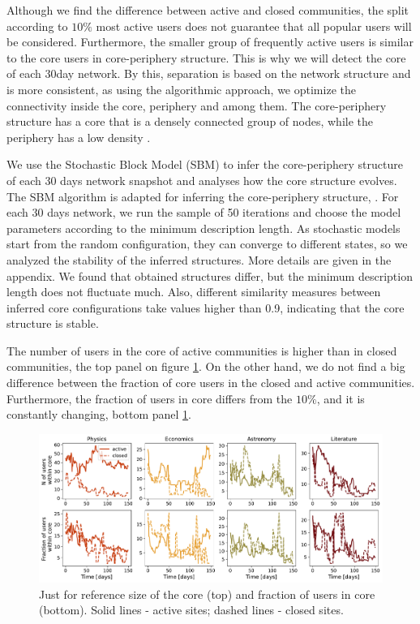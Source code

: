 Although we find the difference between active and closed communities, the split according to $10\%$  most active users does not guarantee that all popular users will be considered. Furthermore, the smaller group of frequently active users is similar to the core users in core-periphery structure. This is why we will detect the core of each 30day network. By this, separation is based on the network structure and is more consistent, as using the algorithmic approach, we optimize the connectivity inside the core, periphery and among them. The core-periphery structure has a core that is a densely connected group of nodes, while the periphery has a low density \cite{fortunato2010community, gallagher2020clarified}. 

We use the Stochastic Block Model (SBM) to infer the core-periphery structure of each 30 days network snapshot and analyses how the core structure evolves. The  SBM algorithm is adapted for inferring the core-periphery structure, \cite{gallagher2020clarified}. For each 30 days network, we run the sample of 50 iterations and choose the model parameters according to the minimum description length. As stochastic models start from the random configuration, they can converge to different states, so we analyzed the stability of the inferred structures. More details are given in the appendix. We found that obtained structures differ, but the minimum description length does not fluctuate much. Also, different similarity measures between inferred core configurations take values higher than 0.9, indicating that the core structure is stable. 

The number of users in the core of active communities is higher than in closed communities, the top panel on figure \ref{fig:core_size}. On the other hand, we do not find a big difference between the fraction of core users in the closed and active communities. Furthermore, the fraction of users in core differs from the $10\%$, and it is constantly changing, bottom panel \ref{fig:core_size}. 

\begin{figure}[h!]
	\centering
	\includegraphics[width=\linewidth]{figures/stackexchange/core_users.pdf}
	\caption{Just for reference size of the core (top) and fraction of users in core (bottom). Solid lines - active sites; dashed lines - closed sites.}
	\label{fig:core_size}
\end{figure}

